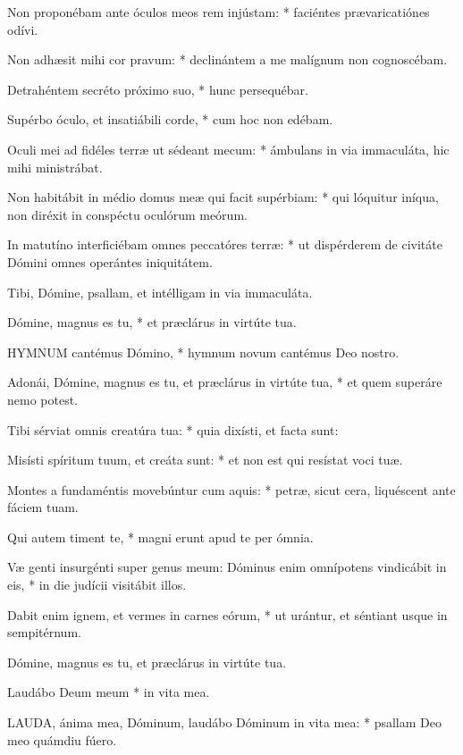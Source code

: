 Non proponébam ante óculos meos rem injústam: * faciéntes prævaricatiónes odívi.

Non adhæsit mihi cor pravum: * declinántem a me malígnum non cognoscébam.

Detrahéntem secréto próximo suo, * hunc persequébar.

Supérbo óculo, et insatiábili corde, * cum hoc non edébam.

Oculi mei ad fidéles terræ ut sédeant mecum: * ámbulans in via immaculáta, hic mihi ministrábat.

Non habitábit in médio domus meæ qui facit supérbiam: * qui lóquitur iníqua, non diréxit in conspéctu oculórum meórum.

In matutíno interficiébam omnes peccatóres terræ: * ut dispérderem de civitáte Dómini omnes operántes iniquitátem.

 Tibi, Dómine, psallam, et intélligam in via immaculáta.

 Dómine, magnus es tu, * et præclárus in virtúte tua.


\lettrine[lines=2]{H}{YMNUM} cantémus Dómino, * hymnum novum cantémus Deo nostro.

Adonái, Dómine, magnus es tu, et præclárus in virtúte tua, * et quem superáre nemo potest.

Tibi sérviat omnis creatúra tua: * quia dixísti, et facta sunt:

Misísti spíritum tuum, et creáta sunt: * et non est qui resístat voci tuæ.

Montes a fundaméntis movebúntur cum aquis: * petræ, sicut cera, liquéscent ante fáciem tuam.

Qui autem timent te, * magni erunt apud te per ómnia.

Væ genti insurgénti super genus meum: Dóminus enim omnípotens vindicábit in eis, * in die judícii visitábit illos.

Dabit enim ignem, et vermes in carnes eórum, * ut urántur, et séntiant usque in sempitérnum.

 Dómine, magnus es tu, et præclárus in virtúte tua.

 Laudábo Deum meum * in vita mea.


\lettrine[lines=2]{L}{AUDA}, ánima mea, Dóminum, laudábo Dóminum in vita mea: * psallam Deo meo quámdiu fúero.

